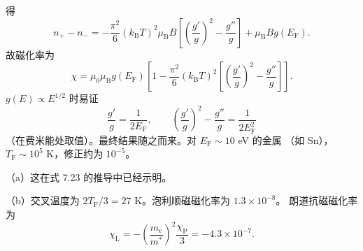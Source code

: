 得
\begin{equation*}
n_{+}-n_{-} = -\frac{\pi^{2}}{6}(k_{\mathrm{B}}T)^{2}\mu_{\mathrm{B}}B\left[\left(\frac{g'}{g}\right)^{2}-\frac{g''}{g}\right] + \mu_{\mathrm{B}}Bg(E_{\mathrm{F}}).\tag{F.91}
\end{equation*}
故磁化率为
\begin{equation*}
\chi = \mu_0\mu_{\mathrm{B}}g(E_{\mathrm{F}})\left[1-\frac{\pi^{2}}{6}(k_{\mathrm{B}}T)^{2}\left[\left(\frac{g'}{g}\right)^{2}-\frac{g''}{g}\right]\right].\tag{F.92}
\end{equation*}
$g(E)\propto E^{1/2}$ 时易证
\begin{equation*}
\frac{g'}{g} = \frac{1}{2E_{\mathrm{F}}},\qquad \left(\frac{g'}{g}\right)^{2}-\frac{g''}{g} = \frac{1}{2E_{\mathrm{F}}^{2}}\tag{F.93}
\end{equation*}
（在费米能处取值）。最终结果随之而来。对 $E_{\mathrm{F}}\sim10$ eV 的金属
（如 Sn），$T_{\mathrm{F}}\sim10^{5}$ K，修正约为 $10^{-5}$。

 （a）这在式 7.23 的推导中已经示明。

（b）交叉温度为 $2T_{\mathrm{F}}/3=27$ K。泡利顺磁磁化率为 $1.3\times10^{-8}$。
朗道抗磁磁化率为
\begin{equation*}
\chi_{\mathrm{L}} = -\left(\frac{m_{\mathrm{e}}}{m^{*}}\right)^{2}\frac{\chi_{\mathrm{P}}}{3} = -4.3\times10^{-7}.\tag{F.94}
\end{equation*}

